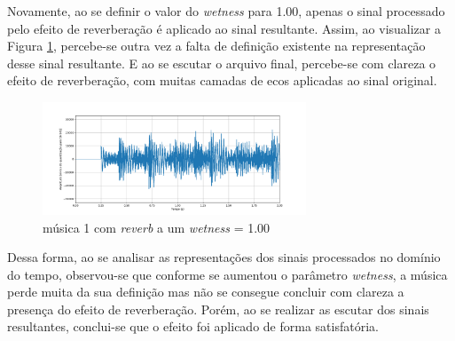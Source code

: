 Novamente, ao se definir o valor do \textit{wetness} para 1.00, apenas o sinal processado pelo efeito de reverberação é aplicado ao sinal resultante. Assim, ao visualizar a Figura \ref{fig96}, percebe-se outra vez a falta de definição existente na representação desse sinal resultante. E ao se escutar o arquivo final, percebe-se com clareza o efeito de reverberação, com muitas camadas de ecos aplicadas ao sinal original.

\begin{figure}[h]
    \centering
    \includegraphics[width=0.7\textwidth]{figuras/fig96.png}
    \caption{música 1 com \textit{reverb} a um \textit{wetness} = 1.00}
    \label{fig96}
\end{figure}

Dessa forma, ao se analisar as representações dos sinais processados no domínio do tempo, observou-se que conforme se aumentou o parâmetro \textit{wetness}, a música perde muita da sua definição mas não se consegue concluir com clareza a presença do efeito de reverberação. Porém, ao se realizar as escutar dos sinais resultantes, conclui-se que o efeito foi aplicado de forma satisfatória.